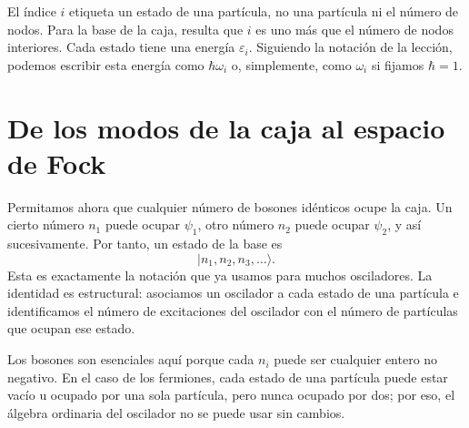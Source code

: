 El índice \(i\) etiqueta un estado de una partícula, no una partícula ni el número de nodos. Para la base de la caja, resulta que \(i\) es uno más que el número de nodos interiores. Cada estado tiene una energía \(\varepsilon_i\). Siguiendo la notación de la lección, podemos escribir esta energía como \(\hbar\omega_i\) o, simplemente, como \(\omega_i\) si fijamos \(\hbar=1\).

\begin{classroomqa}
\end{classroomqa}

\begin{classroomqa}
\end{classroomqa}

\section{De los modos de la caja al espacio de Fock}

Permitamos ahora que cualquier número de bosones idénticos ocupe la caja. Un cierto número \(n_1\) puede ocupar \(\psi_1\), otro número \(n_2\) puede ocupar \(\psi_2\), y así sucesivamente. Por tanto, un estado de la base es
\begin{equation}
|n_1,n_2,n_3,\ldots\rangle.
\end{equation}
Esta es exactamente la notación que ya usamos para muchos osciladores. La identidad es estructural: asociamos un oscilador a cada estado de una partícula e identificamos el número de excitaciones del oscilador con el número de partículas que ocupan ese estado.

Los bosones son esenciales aquí porque cada \(n_i\) puede ser cualquier entero no negativo. En el caso de los fermiones, cada estado de una partícula puede estar vacío u ocupado por una sola partícula, pero nunca ocupado por dos; por eso, el álgebra ordinaria del oscilador no se puede usar sin cambios.

